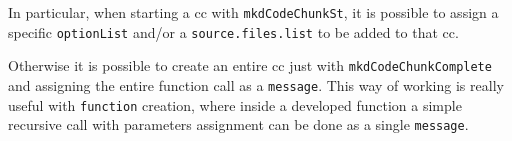 In particular, when starting a \gls{cc} with \lstinline!mkdCodeChunkSt!, it is possible to assign a specific \lstinline!optionList! and/or a \lstinline!source.files.list! to be added to that \gls{cc}.

Otherwise it is possible to create an entire \gls{cc} just with \lstinline!mkdCodeChunkComplete! and assigning the entire function call as a \lstinline!message!.
This way of working is really useful with \lstinline!function! creation, where inside a developed function a simple recursive call with parameters assignment can be done as a single \lstinline!message!.





